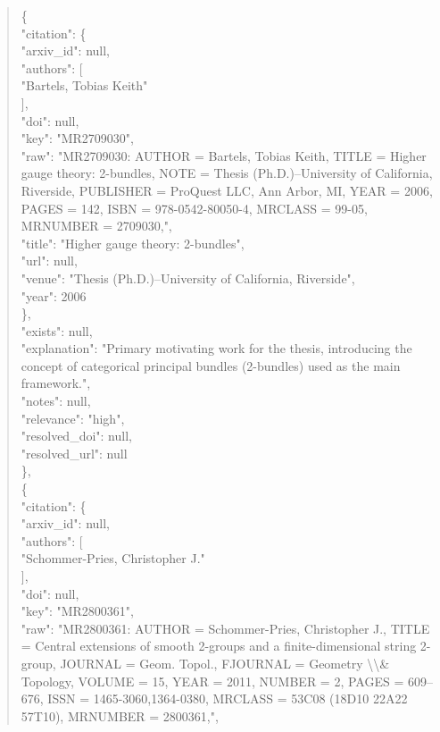 \documentclass[11pt]{article}
\begin{document}
\begin{quote}
    \{\\
      "citation": \{\\
        "arxiv\_id": null,\\
        "authors": [\\
          "Bartels, Tobias Keith"\\
        ],\\
        "doi": null,\\
        "key": "MR2709030",\\
        "raw": "MR2709030: AUTHOR = Bartels, Tobias Keith, TITLE = Higher gauge theory: 2-bundles, NOTE = Thesis (Ph.D.)--University of California, Riverside, PUBLISHER = ProQuest LLC, Ann Arbor, MI, YEAR = 2006, PAGES = 142, ISBN = 978-0542-80050-4, MRCLASS = 99-05, MRNUMBER = 2709030,",\\
        "title": "Higher gauge theory: 2-bundles",\\
        "url": null,\\
        "venue": "Thesis (Ph.D.)--University of California, Riverside",\\
        "year": 2006\\
      \},\\
      "exists": null,\\
      "explanation": "Primary motivating work for the thesis, introducing the concept of categorical principal bundles (2-bundles) used as the main framework.",\\
      "notes": null,\\
      "relevance": "high",\\
      "resolved\_doi": null,\\
      "resolved\_url": null\\
    \},\\
    \{\\
      "citation": \{\\
        "arxiv\_id": null,\\
        "authors": [\\
          "Schommer-Pries, Christopher J."\\
        ],\\
        "doi": null,\\
        "key": "MR2800361",\\
        "raw": "MR2800361: AUTHOR = Schommer-Pries, Christopher J., TITLE = Central extensions of smooth 2-groups and a finite-dimensional string 2-group, JOURNAL = Geom. Topol., FJOURNAL = Geometry \textbackslash{}\textbackslash{}\& Topology, VOLUME = 15, YEAR = 2011, NUMBER = 2, PAGES = 609--676, ISSN = 1465-3060,1364-0380, MRCLASS = 53C08 (18D10 22A22 57T10), MRNUMBER = 2800361,",\\

\end{quote}
\end{document}
